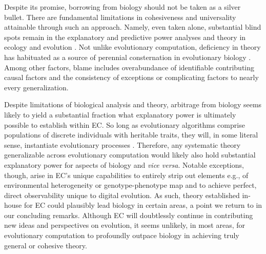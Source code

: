 Despite its promise, borrowing from biology should not be taken as a silver bullet.
There are fundamental limitations in cohesiveness and universality attainable through such an approach.
Namely, even taken alone, substantial blind spots remain in the explanatory and predictive power analyses and theory in ecology and evolution \citep{TODO}.
Not unlike evolutionary computation, deficiency in theory has habituated as a source of perennial consternation in evolutionary biology \citep{welch2017wrong}.
Among other factors, blame includes overabundance of identifiable contributing causal factors and the consistency of exceptions or complicating factors to nearly every generalization.

Despite limitations of biological analysis and theory, arbitrage from biology seems likely to yield a substantial fraction what explanatory power is ultimately possible to establish within EC.
So long as evolutionary algorithms comprise populations of discrete individuals with heritable traits, they will, in some literal sense, instantiate evolutionary processes \citep{pennock2007models}.
Therefore, any systematic theory generalizable across evolutionary computation would likely also hold substantial explanatory power for aspects of biology and \textit{vice versa}.
Notable exceptions, though, arise in EC's unique capabilities to entirely strip out elements e.g., of environmental heterogeneity or genotype-phenotype map and to achieve perfect, direct observability unique to digital evolution.
As such, theory established in-house for EC could plausibly lead biology in certain areas, a point we return to in our concluding remarks.
Although EC will doubtlessly continue in contributing new ideas and perspectives on evolution, it seems unlikely, in most areas, for evolutionary computation to profoundly outpace biology in achieving truly general or cohesive theory.

